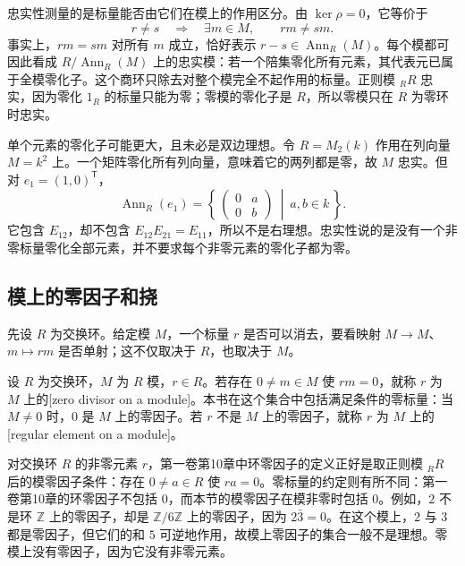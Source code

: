 忠实性测量的是标量能否由它们在模上的作用区分。由 \(\ker\rho=0\)，它等价于
\[
	r\ne s\quad\Longrightarrow\quad \exists m\in M,\qquad rm\ne sm.
\]
事实上，\(rm=sm\) 对所有 \(m\) 成立，恰好表示 \(r-s\in\operatorname{Ann}_R(M)\)。每个模都可因此看成 \(R/\operatorname{Ann}_R(M)\) 上的忠实模：若一个陪集零化所有元素，其代表元已属于全模零化子。这个商环只除去对整个模完全不起作用的标量。正则模 \({}_RR\) 忠实，因为零化 \(1_R\) 的标量只能为零；零模的零化子是 \(R\)，所以零模只在 \(R\) 为零环时忠实。

\ProseParagraphBreak
单个元素的零化子可能更大，且未必是双边理想。令 \(R=M_2(k)\) 作用在列向量 \(M=k^2\) 上。一个矩阵零化所有列向量，意味着它的两列都是零，故 \(M\) 忠实。但对 \(e_1=(1,0)^{\mathsf T}\)，
\[
	\operatorname{Ann}_R(e_1)
	=\left\{\,\begin{pmatrix}0&a\\0&b\end{pmatrix}\ \middle|\ a,b\in k\,\right\}.
\]
它包含 \(E_{12}\)，却不包含 \(E_{12}E_{21}=E_{11}\)，所以不是右理想。忠实性说的是没有一个非零标量零化全部元素，并不要求每个非零元素的零化子都为零。

\subsection{模上的零因子和挠}
\label{b2:subsec:0203:03}

先设 \(R\) 为交换环。给定模 \(M\)，一个标量 \(r\) 是否可以消去，要看映射 \(M\to M\)、\(m\mapsto rm\) 是否单射；这不仅取决于 \(R\)，也取决于 \(M\)。

\begin{definition}\label{b2:def:module-zero-divisor}
	设 \(R\) 为交换环，\(M\) 为 \(R\) 模，\(r\in R\)。若存在 \(0\ne m\in M\) 使 \(rm=0\)，就称 \(r\) 为 \(M\) 上的[zero divisor on a module]。本书在这个集合中包括满足条件的零标量：当 \(M\ne0\) 时，\(0\) 是 \(M\) 上的零因子。若 \(r\) 不是 \(M\) 上的零因子，就称 \(r\) 为 \(M\) 上的[regular element on a module]。
\end{definition}

对交换环 \(R\) 的非零元素 \(r\)，第一卷第10章中环零因子的定义正好是取正则模 \({}_RR\) 后的模零因子条件：存在 \(0\ne a\in R\) 使 \(ra=0\)。零标量的约定则有所不同：第一卷第10章的环零因子不包括 \(0\)，而本节的模零因子在模非零时包括 \(0\)。例如，\(2\) 不是环 \(\mathbb Z\) 上的零因子，却是 \(\mathbb Z/6\mathbb Z\) 上的零因子，因为 \(2\bar3=0\)。在这个模上，\(2\) 与 \(3\) 都是零因子，但它们的和 \(5\) 可逆地作用，故模上零因子的集合一般不是理想。零模上没有零因子，因为它没有非零元素。

